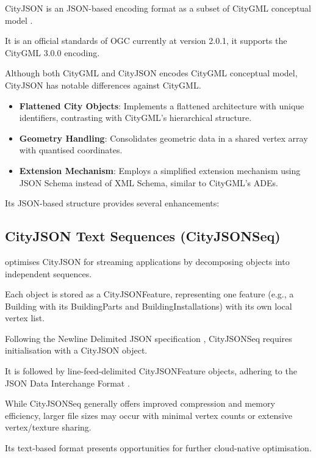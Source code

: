 CityJSON is an JSON-based \citep{json} encoding format as a subset of CityGML conceptual model \citep{CityGML}.

It is an official standards of OGC \citep{ogc} currently at version 2.0.1, it supports the CityGML 3.0.0 encoding.

Although both CityGML and CityJSON encodes CityGML conceptual model, CityJSON has notable differences against CityGML.

\begin{itemize}
  \item \textbf{Flattened City Objects}: Implements a flattened architecture with unique identifiers, contrasting with CityGML's hierarchical structure.
  \item \textbf{Geometry Handling}: Consolidates geometric data in a shared vertex array with quantised coordinates.
  \item \textbf{Extension Mechanism}: Employs a simplified extension mechanism using JSON Schema instead of XML Schema, similar to CityGML's ADEs.
\end{itemize}

Its JSON-based structure provides several enhancements:

\subsection{CityJSON Text Sequences (CityJSONSeq)}
\label{rw:cityjson_enhancements:cityjsonseq}

\citet{ledoux_2024} optimises CityJSON for streaming applications by decomposing objects into independent sequences.

Each object is stored as a CityJSONFeature, representing one feature (e.g., a Building with its BuildingParts and BuildingInstallations) with its own local vertex list.

Following the Newline Delimited JSON specification \citep{jsonnd}, CityJSONSeq requires initialisation with a CityJSON object.

It is followed by line-feed-delimited CityJSONFeature objects, adhering to the JSON Data Interchange Format \citep{json_data_interchange_format}.

While CityJSONSeq generally offers improved compression and memory efficiency, larger file sizes may occur with minimal vertex counts or extensive vertex/texture sharing.

Its text-based format presents opportunities for further cloud-native optimisation.


